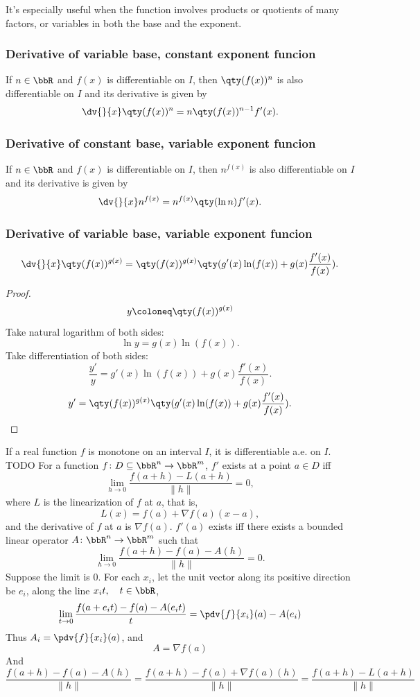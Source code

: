 It’s especially useful when the function involves products or quotients of many factors, or variables in both the base and the exponent.
\subsubsection{Derivative of variable base, constant exponent funcion}
If $n\in\bbR$ and $f(x)$ is differentiable on $I$, then $\qty(f(x))^n$ is also differentiable on $I$ and its derivative is given by
\[\dv{}{x}\qty(f(x))^n=n\qty(f(x))^{n-1}f'(x).\]
\subsubsection{Derivative of constant base, variable exponent funcion}
If $n\in\bbR$ and $f(x)$ is differentiable on $I$, then $n^{f(x)}$ is also differentiable on $I$ and its derivative is given by
\[\dv{}{x}n^{f(x)}=n^{f(x)}\qty(\ln n)f'(x).\]
\subsubsection{Derivative of variable base, variable exponent funcion}
\[\dv{}{x}\qty(f(x))^{g(x)}=\qty(f(x))^{g(x)}\qty(g'(x)\ln(f(x))+g(x)\frac{f'(x)}{f(x)}).\]
\begin{proof}
\[y\coloneq\qty(f(x))^{g(x)}\]
Take natural logarithm of both sides:
\[\ln y=g(x)\ln(f(x)).\]
Take differentiation of both sides:
\[\frac{y'}{y}=g'(x)\ln(f(x))+g(x)\frac{f'(x)}{f(x)}.\]
\[y'=\qty(f(x))^{g(x)}\qty(g'(x)\ln(f(x))+g(x)\frac{f'(x)}{f(x)}).\]
\end{proof}
If a real function $f$ is monotone on an interval $I$, it is differentiable a.e. on $I$.
\bpr
TODO
\epr
{}
For a function $f\colon D\subseteq\bbR^n\to\bbR^m$, $f'$ exists at a point $a\in D$ iff
\[\lim_{h\to 0}\frac{f(a+h)-L(a+h)}{\|h\|}=0,\]
where $L$ is the linearization of $f$ at $a$, that is,
\[L(x)=f(a)+\nabla f(a)(x-a),\]
and the derivative of $f$ at $a$ is $\nabla f(a)$.
\bpr
$f'(a)$ exists iff there exists a bounded linear operator $A\colon\bbR^n\to\bbR^m$ such that
\[\lim_{h\to0}\frac{f(a+h)-f(a)-A(h)}{\|h\|}=0.\]
Suppose the limit is 0. For each $x_i$, let the unit vector along its positive direction be $e_i$, along the line $x_it,\quad t\in\bbR$,
\[\lim_{t\to0}\frac{f(a+e_it)-f(a)-A(e_it)}{t}=\pdv{f}{x_i}(a)-A(e_i)\]
Thus $A_i=\pdv{f}{x_i}(a)$, and
\[A=\nabla f(a)\]
And
\[\frac{f(a+h)-f(a)-A(h)}{\|h\|}=\frac{f(a+h)-f(a)+\nabla f(a)(h)}{\|h\|}=\frac{f(a+h)-L(a+h)}{\|h\|}\]
\epr
